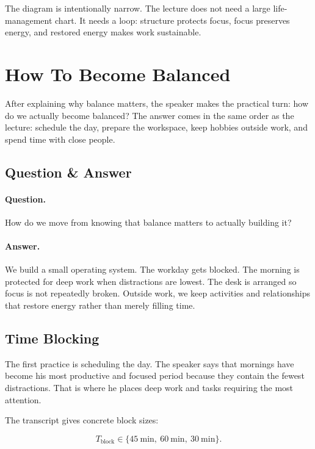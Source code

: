 The diagram is intentionally narrow. The lecture does not need a large life-management chart. It needs a loop: structure protects focus, focus preserves energy, and restored energy makes work sustainable.

\section{How To Become Balanced}

After explaining why balance matters, the speaker makes the practical turn: how do we actually become balanced? The answer comes in the same order as the lecture: schedule the day, prepare the workspace, keep hobbies outside work, and spend time with close people.

\subsection{Question \& Answer}

\paragraph{Question.}
How do we move from knowing that balance matters to actually building it?

\paragraph{Answer.}
We build a small operating system. The workday gets blocked. The morning is protected for deep work when distractions are lowest. The desk is arranged so focus is not repeatedly broken. Outside work, we keep activities and relationships that restore energy rather than merely filling time.

\subsection{Time Blocking}

The first practice is scheduling the day. The speaker says that mornings have become his most productive and focused period because they contain the fewest distractions. That is where he places deep work and tasks requiring the most attention.

The transcript gives concrete block sizes:

\begin{equation}
T_{\mathrm{block}}
\in
\{45\ \mathrm{min},\ 60\ \mathrm{min},\ 30\ \mathrm{min}\}.
\end{equation}

